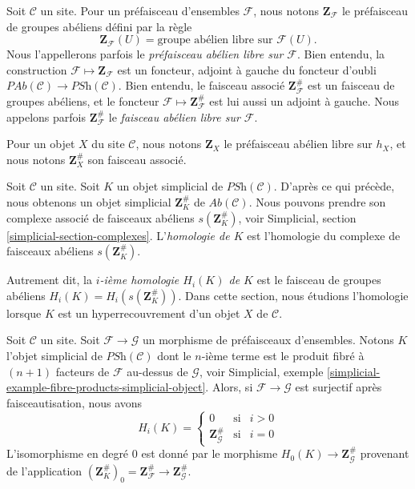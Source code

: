 \noindent
Soit $\mathcal{C}$ un site.
Pour un préfaisceau d'ensembles $\mathcal{F}$, nous notons $\mathbf{Z}_\mathcal{F}$
le préfaisceau de groupes abéliens défini par la règle
$$
\mathbf{Z}_\mathcal{F}(U) = \text{groupe abélien libre sur }\mathcal{F}(U).
$$
Nous l'appellerons parfois le {\it préfaisceau abélien libre sur $\mathcal{F}$}.
Bien entendu, la construction $\mathcal{F} \mapsto \mathbf{Z}_\mathcal{F}$
est un foncteur, adjoint à gauche du foncteur d'oubli
$\textit{PAb}(\mathcal{C}) \to \textit{PSh}(\mathcal{C})$.
Bien entendu, le faisceau associé $\mathbf{Z}_\mathcal{F}^\#$ est
un faisceau de groupes abéliens, et le foncteur
$\mathcal{F} \mapsto \mathbf{Z}_\mathcal{F}^\#$ est lui aussi
un adjoint à gauche. Nous appelons parfois $\mathbf{Z}_\mathcal{F}^\#$
le {\it faisceau abélien libre sur $\mathcal{F}$}.

\medskip\noindent
Pour un objet $X$ du site $\mathcal{C}$, nous notons
$\mathbf{Z}_X$ le préfaisceau abélien libre sur $h_X$, et
nous notons $\mathbf{Z}_X^\#$ son faisceau associé.

\begin{definition}
\label{definition-homology}
Soit $\mathcal{C}$ un site.
Soit $K$ un objet simplicial de $\textit{PSh}(\mathcal{C})$.
D'après ce qui précède, nous obtenons un objet simplicial $\mathbf{Z}_K^\#$ de
$\textit{Ab}(\mathcal{C})$. Nous pouvons prendre son
complexe associé de faisceaux abéliens $s(\mathbf{Z}_K^\#)$, voir
Simplicial, section \ref{simplicial-section-complexes}.
L'{\it homologie de $K$} est l'homologie du
complexe de faisceaux abéliens $s(\mathbf{Z}_K^\#)$.
\end{definition}

\noindent
Autrement dit, la {\it $i$-ième homologie $H_i(K)$ de $K$}
est le faisceau de groupes abéliens $H_i(K) = H_i(s(\mathbf{Z}_K^\#))$.
Dans cette section, nous étudions l'homologie lorsque $K$
est un hyperrecouvrement d'un objet $X$ de $\mathcal{C}$.

\begin{lemma}
\label{lemma-compare-cosk0}
Soit $\mathcal{C}$ un site.
Soit $\mathcal{F} \to \mathcal{G}$ un morphisme
de préfaisceaux d'ensembles. Notons $K$ l'objet
simplicial de $\textit{PSh}(\mathcal{C})$ dont le $n$-ième
terme est le produit fibré à $(n + 1)$ facteurs de $\mathcal{F}$
au-dessus de $\mathcal{G}$, voir
Simplicial, exemple \ref{simplicial-example-fibre-products-simplicial-object}.
Alors, si $\mathcal{F} \to \mathcal{G}$ est surjectif après
faisceautisation, nous avons
$$
H_i(K) =
\left\{
\begin{matrix}
0 & \text{si} & i > 0\\
\mathbf{Z}_\mathcal{G}^\# & \text{si} & i = 0
\end{matrix}
\right.
$$
L'isomorphisme en degré $0$ est donné par le
morphisme $H_0(K) \to \mathbf{Z}_\mathcal{G}^\#$
provenant de l'application $(\mathbf{Z}_K^\#)_0 =
\mathbf{Z}_\mathcal{F}^\# \to \mathbf{Z}_\mathcal{G}^\#$.
\end{lemma}

